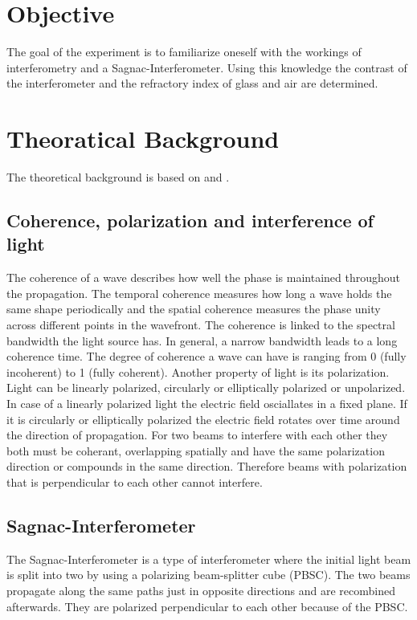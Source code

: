 \section{Objective}
\label{sec:Objective}
The goal of the experiment is to familiarize oneself with the workings of interferometry and a Sagnac-Interferometer. 
Using this knowledge the contrast of the interferometer and the refractory index of glass and air are determined. 

\section{Theoratical Background}
\label{sec:Theorie}
The theoretical background is based on \cite{Optik} and \cite{anleitungV64}.
\subsection{Coherence, polarization and interference of light}
The coherence of a wave describes how well the phase is maintained throughout the propagation. The temporal coherence measures how long a 
wave holds the same shape periodically and the spatial coherence measures the phase unity across different points in the wavefront.
The coherence is linked to the spectral bandwidth the light source has. In general, a narrow bandwidth leads to a long coherence time.
The degree of coherence a wave can have is ranging from 0 (fully incoherent) to 1 (fully coherent). 
Another property of light is its polarization. Light can be linearly polarized, circularly or elliptically polarized or unpolarized. 
In case of a linearly polarized light the electric field osciallates in a fixed plane. If it is circularly or elliptically polarized the 
electric field rotates over time around the direction of propagation. 
For two beams to interfere with each other they both must be coherant, overlapping spatially and have the same polarization direction or
compounds in the same direction. Therefore beams with polarization that is perpendicular to each other cannot interfere. 

\subsection{Sagnac-Interferometer}
\label{subsec:Sagnac_Interferometer}
The Sagnac-Interferometer is a type of interferometer where the initial light beam is split into two by using a polarizing beam-splitter 
cube (PBSC). The two beams propagate along the same paths just in opposite directions and are recombined afterwards. They are polarized 
perpendicular to each other because of the PBSC.

